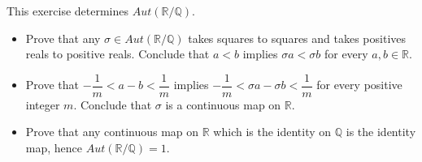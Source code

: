 \documentclass[11pt]{article}
\newenvironment{problem}[2][Problem\!]{\begin{tcolorbox}\begin{trivlist}
\item[\hskip \labelsep {\bfseries #1}\hskip \labelsep {\bfseries #2}]}{\end{trivlist}\end{tcolorbox}}
\newcommand{\qq}{\mathbb Q}   %
\newcommand{\rr}{\mathbb R}   %
\begin{document}
\begin{problem}{14.1.7}
  This exercise determines $Aut(\rr/ \qq)$.
  \begin{itemize}
    \item[(a)] Prove that any $\sigma \in Aut(\rr/\qq)$ takes squares to squares and takes positives reals to positive reals. Conclude that $a < b$ implies $\sigma a < \sigma b$ for every $a,b\in \rr$.
    \item[(b)] Prove that $-\dfrac{1}{m} < a-b < \dfrac{1}{m}$ implies $-\dfrac{1}{m} < \sigma a - \sigma b < \dfrac{1}{m}$ for every positive integer $m$. Conclude that $\sigma$ is a continuous map on $\rr$. 
    \item[(c)]  Prove that any continuous map on $\rr$ which is the identity on $\qq$ is the identity map, hence $Aut(\rr/ \qq ) = 1$.
  \end{itemize}
\end{problem}
\end{document}
